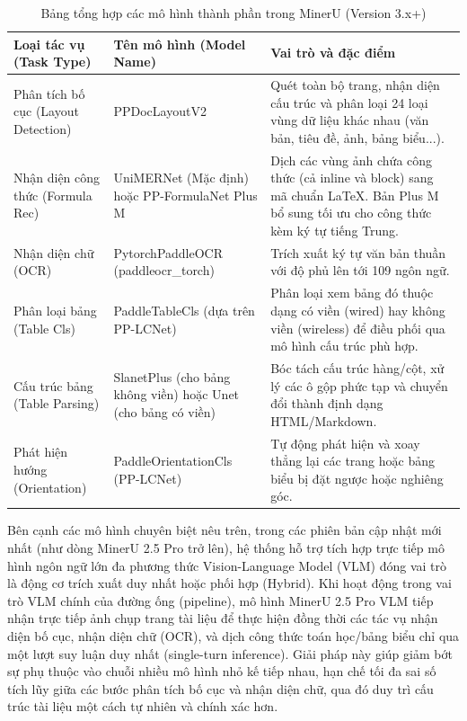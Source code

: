 \begin{table}[H]
	\centering
	\renewcommand{\arraystretch}{1.4}
	\caption{Bảng tổng hợp các mô hình thành phần trong MinerU (Version 3.x+)}
	\label{tab:mineru_models}
	\begin{tabular}{|>{\raggedright\arraybackslash}p{4.2cm}|>{\raggedright\arraybackslash}p{4.0cm}|>{\raggedright\arraybackslash}p{6.8cm}|}
		\hline
		\textbf{Loại tác vụ (Task Type)} & \textbf{Tên mô hình (Model Name)} & \textbf{Vai trò và đặc điểm} \\ \hline
		Phân tích bố cục (Layout Detection) & PPDocLayoutV2 & Quét toàn bộ trang, nhận diện cấu trúc và phân loại 24 loại vùng dữ liệu khác nhau (văn bản, tiêu đề, ảnh, bảng biểu...). \\ \hline
		Nhận diện công thức (Formula Rec) & UniMERNet (Mặc định) hoặc PP-FormulaNet Plus M & Dịch các vùng ảnh chứa công thức (cả inline và block) sang mã chuẩn LaTeX. Bản Plus M bổ sung tối ưu cho công thức kèm ký tự tiếng Trung. \\ \hline
		Nhận diện chữ (OCR) & PytorchPaddleOCR (paddleocr\_torch) & Trích xuất ký tự văn bản thuần với độ phủ lên tới 109 ngôn ngữ. \\ \hline
		Phân loại bảng (Table Cls) & PaddleTableCls (dựa trên PP-LCNet) & Phân loại xem bảng đó thuộc dạng có viền (wired) hay không viền (wireless) để điều phối qua mô hình cấu trúc phù hợp. \\ \hline
		Cấu trúc bảng (Table Parsing) & SlanetPlus (cho bảng không viền) hoặc Unet (cho bảng có viền) & Bóc tách cấu trúc hàng/cột, xử lý các ô gộp phức tạp và chuyển đổi thành định dạng HTML/Markdown. \\ \hline
		Phát hiện hướng (Orientation) & PaddleOrientationCls (PP-LCNet) & Tự động phát hiện và xoay thẳng lại các trang hoặc bảng biểu bị đặt ngược hoặc nghiêng góc. \\ \hline
	\end{tabular}
\end{table}

\indent Bên cạnh các mô hình chuyên biệt nêu trên, trong các phiên bản cập nhật mới nhất (như dòng MinerU 2.5 Pro trở lên), hệ thống hỗ trợ tích hợp trực tiếp mô hình ngôn ngữ lớn đa phương thức Vision-Language Model (VLM) đóng vai trò là động cơ trích xuất duy nhất hoặc phối hợp (Hybrid). Khi hoạt động trong vai trò VLM chính của đường ống (pipeline), mô hình MinerU 2.5 Pro VLM tiếp nhận trực tiếp ảnh chụp trang tài liệu để thực hiện đồng thời các tác vụ nhận diện bố cục, nhận diện chữ (OCR), và dịch công thức toán học/bảng biểu chỉ qua một lượt suy luận duy nhất (single-turn inference). Giải pháp này giúp giảm bớt sự phụ thuộc vào chuỗi nhiều mô hình nhỏ kế tiếp nhau, hạn chế tối đa sai số tích lũy giữa các bước phân tích bố cục và nhận diện chữ, qua đó duy trì cấu trúc tài liệu một cách tự nhiên và chính xác hơn.

